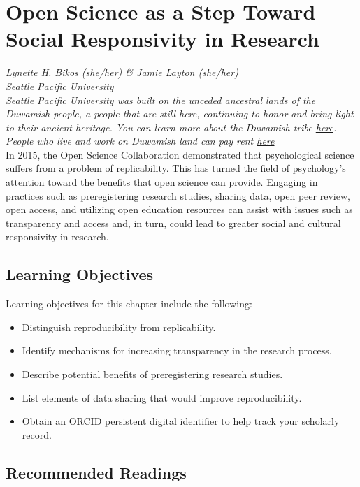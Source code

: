 \documentclass[
  11pt,
]{book}
\providecommand{\tightlist}{%
  \setlength{\itemsep}{0pt}\setlength{\parskip}{0pt}}
\begin{document}
\chapter{Open Science as a Step Toward Social Responsivity in Research}\label{OpSci}

\emph{Lynette H. Bikos (she/her) \& Jamie Layton (she/her)}\\
\emph{Seattle Pacific University}\\
\emph{Seattle Pacific University was built on the unceded ancestral lands of the Duwamish people, a people that are still here, continuing to honor and bring light to their ancient heritage. You can learn more about the Duwamish tribe \href{https://www.duwamishtribe.org/}{here}. People who live and work on Duwamish land can pay rent \href{https://www.realrentduwamish.org/}{here}}\\

In 2015, the Open Science Collaboration demonstrated that psychological science suffers from a problem of replicability. This has turned the field of psychology's attention toward the benefits that open science can provide. Engaging in practices such as preregistering research studies, sharing data, open peer review, open access, and utilizing open education resources can assist with issues such as transparency and access and, in turn, could lead to greater social and cultural responsivity in research.

\section{Learning Objectives}\label{learning-objectives-5}

Learning objectives for this chapter include the following:

\begin{itemize}
\tightlist
\item
  Distinguish reproducibility from replicability.
\item
  Identify mechanisms for increasing transparency in the research process.
\item
  Describe potential benefits of preregistering research studies.
\item
  List elements of data sharing that would improve reproducibility.
\item
  Obtain an ORCID persistent digital identifier to help track your scholarly record.
\end{itemize}

\section{Recommended Readings}\label{recommended-readings-1}
\end{document}
